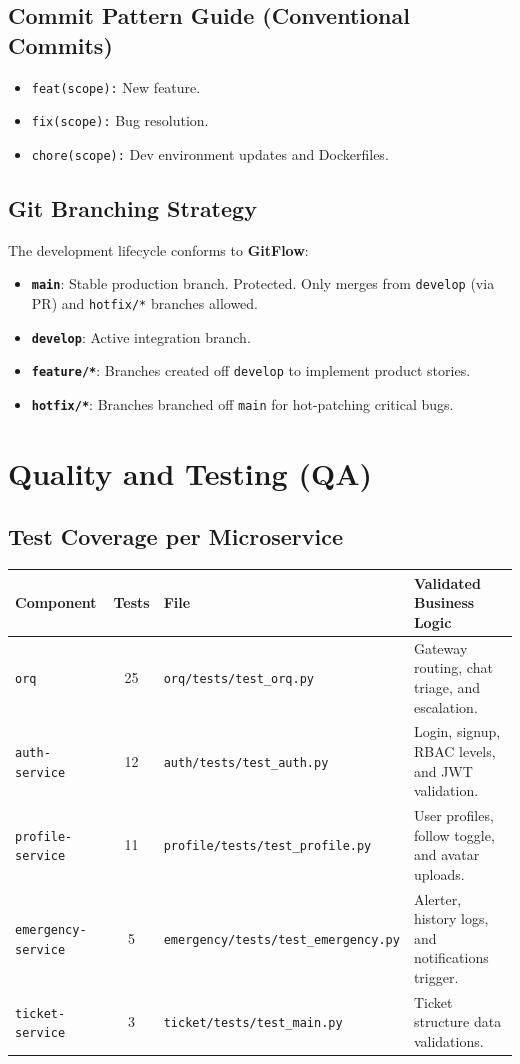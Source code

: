 \subsection{Commit Pattern Guide (Conventional Commits)}
\begin{itemize}
    \item \texttt{feat(scope):} New feature.
    \item \texttt{fix(scope):} Bug resolution.
    \item \texttt{chore(scope):} Dev environment updates and Dockerfiles.
\end{itemize}

\subsection{Git Branching Strategy}
The development lifecycle conforms to \textbf{GitFlow}:
\begin{itemize}
    \item \textbf{\texttt{main}}: Stable production branch. Protected. Only merges from \texttt{develop} (via \ac{PR}) and \texttt{hotfix/*} branches allowed.
    \item \textbf{\texttt{develop}}: Active integration branch.
    \item \textbf{\texttt{feature/*}}: Branches created off \texttt{develop} to implement product stories.
    \item \textbf{\texttt{hotfix/*}}: Branches branched off \texttt{main} for hot-patching critical bugs.
\end{itemize}

\newpage

\section{Quality and Testing (\ac{QA})}

\subsection{Test Coverage per Microservice}
\begin{tabular}{|l|c|l|p{7.5cm}|}
\hline
\textbf{Component} & \textbf{Tests} & \textbf{File} & \textbf{Validated Business Logic} \\ \hline
\texttt{orq} & 25 & \texttt{orq/tests/test\_orq.py} & Gateway routing, chat triage, and escalation. \\ \hline
\texttt{auth-service} & 12 & \texttt{auth/tests/test\_auth.py} & Login, signup, \ac{RBAC} levels, and \ac{JWT} validation. \\ \hline
\texttt{profile-service} & 11 & \texttt{profile/tests/test\_profile.py} & User profiles, follow toggle, and avatar uploads. \\ \hline
\texttt{emergency-service} & 5 & \texttt{emergency/tests/test\_emergency.py} & Alerter, history logs, and notifications trigger. \\ \hline
\texttt{ticket-service} & 3 & \texttt{ticket/tests/test\_main.py} & Ticket structure data validations. \\ \hline
\end{tabular}

